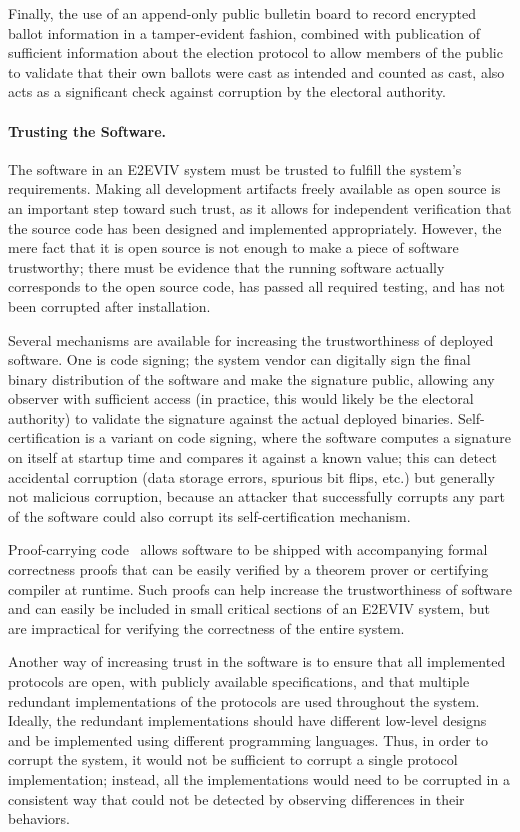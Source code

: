 Finally, the use of an append-only public bulletin board to record
encrypted ballot information in a tamper-evident fashion, combined
with publication of sufficient information about the election protocol
to allow members of the public to validate that their own ballots were
cast as intended and counted as cast, also acts as a significant check
against corruption by the electoral authority.

\paragraph{Trusting the Software.} The software in an E2EVIV system
must be trusted to fulfill the system's requirements. Making all
development artifacts freely available as open source is an important
step toward such trust, as it allows for independent verification that
the source code has been designed and implemented
appropriately. However, the mere fact that it is open source is not
enough to make a piece of software trustworthy; there must be evidence
that the running software actually corresponds to the open source
code, has passed all required testing, and has not been corrupted
after installation.

Several mechanisms are available for increasing the trustworthiness of
deployed software. One is code signing; the system vendor can
digitally sign the final binary distribution of the software and make
the signature public, allowing any observer with sufficient access (in
practice, this would likely be the electoral authority) to validate
the signature against the actual deployed binaries. Self-certification
is a variant on code signing, where the software computes a signature
on itself at startup time and compares it against a known value;
this can detect accidental corruption (data storage errors, spurious
bit flips, etc.) but generally not malicious corruption, because an
attacker that successfully corrupts any part of the software could
also corrupt its self-certification mechanism.

Proof-carrying code~\cite{Necula02} allows software to be shipped with
accompanying formal correctness proofs that can be easily verified by
a theorem prover or certifying compiler at runtime. Such proofs can
help increase the trustworthiness of software and can easily be
included in small critical sections of an E2EVIV system, but are
impractical for verifying the correctness of the entire system.

Another way of increasing trust in the software is to ensure that all
implemented protocols are open, with publicly available
specifications, and that multiple redundant implementations of the
protocols are used throughout the system. Ideally, the redundant
implementations should have different low-level designs and be
implemented using different programming languages. Thus, in order to
corrupt the system, it would not be sufficient to corrupt a single
protocol implementation; instead, all the implementations would need
to be corrupted in a consistent way that could not be detected by
observing differences in their behaviors.

